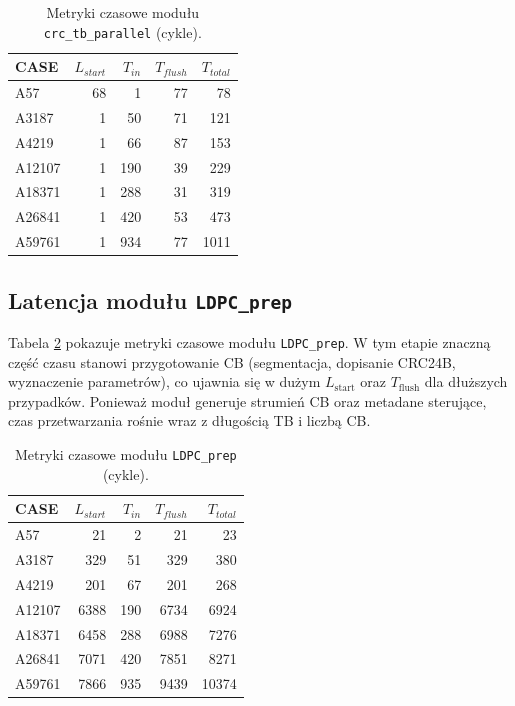 \begin{table}[!ht]
\centering
\caption{Metryki czasowe modułu \texttt{crc\_tb\_parallel} (cykle).}
\label{tab:lat_crc_tb_parallel}
\begin{tabular}{lrrrr}
\hline
CASE & $L_{start}$ & $T_{in}$ & $T_{flush}$ & $T_{total}$ \\
\hline
A57     & 68 & 1   & 77 & 78 \\
A3187   & 1  & 50  & 71 & 121 \\
A4219   & 1  & 66  & 87 & 153 \\
A12107  & 1  & 190 & 39 & 229 \\
A18371  & 1  & 288 & 31 & 319 \\
A26841  & 1  & 420 & 53 & 473 \\
A59761  & 1  & 934 & 77 & 1011 \\
\hline
\end{tabular}
\end{table}

\subsection{Latencja modułu \texttt{LDPC\_prep}}
\label{subsec:lat_ldpc_prep}

Tabela \ref{tab:lat_ldpc_prep} pokazuje metryki czasowe modułu \texttt{LDPC\_prep}.
W tym etapie znaczną część czasu stanowi przygotowanie CB (segmentacja, dopisanie CRC24B, wyznaczenie parametrów),
co ujawnia się w dużym $L_{\mathrm{start}}$ oraz $T_{\mathrm{flush}}$ dla dłuższych przypadków.
Ponieważ moduł generuje strumień CB oraz metadane sterujące, czas przetwarzania rośnie wraz z długością TB i liczbą CB.


\begin{table}[!ht]
\centering
\caption{Metryki czasowe modułu \texttt{LDPC\_prep} (cykle).}
\label{tab:lat_ldpc_prep}
\begin{tabular}{lrrrr}
\hline
CASE & $L_{start}$ & $T_{in}$ & $T_{flush}$ & $T_{total}$ \\
\hline
A57     & 21   & 2   & 21    & 23 \\
A3187   & 329  & 51  & 329   & 380 \\
A4219   & 201  & 67  & 201   & 268 \\
A12107  & 6388 & 190 & 6734  & 6924 \\
A18371  & 6458 & 288 & 6988  & 7276 \\
A26841  & 7071 & 420 & 7851  & 8271 \\
A59761  & 7866 & 935 & 9439  & 10374 \\
\hline
\end{tabular}
\end{table}

